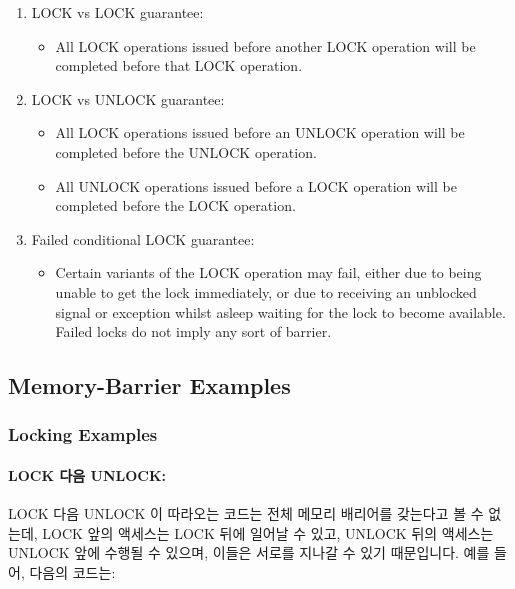 \begin{enumerate}
\begin{enumerate}
\item	LOCK vs LOCK guarantee:
	\begin{itemize}
	\item	All LOCK operations issued before another LOCK operation
		will be completed before that LOCK operation.
	\end{itemize}
\item	LOCK vs UNLOCK guarantee:
	\begin{itemize}
	\item	All LOCK operations issued before an UNLOCK operation
		will be completed before the UNLOCK operation.
	\item	All UNLOCK operations issued before a LOCK operation
		will be completed before the LOCK operation.
	\end{itemize}
\item	Failed conditional LOCK guarantee:
	\begin{itemize}
	\item	Certain variants of the LOCK operation may fail, either
		due to being unable to get the lock immediately, or due
		to receiving an unblocked signal or exception
		whilst asleep waiting
		for the lock to become available.  Failed locks do not
		imply any sort of barrier.
	\end{itemize}
\end{enumerate}
\fi

\subsection{Memory-Barrier Examples}
\label{sec:advsync:Memory-Barrier Examples}

\subsubsection{Locking Examples}

\paragraph{LOCK 다음 UNLOCK:}
LOCK 다음 UNLOCK 이 따라오는 코드는 전체 메모리 배리어를 갖는다고 볼 수 없는데,
LOCK 앞의 액세스는 LOCK 뒤에 일어날 수 있고, UNLOCK 뒤의 액세스는 UNLOCK 앞에
수행될 수 있으며, 이들은 서로를 지나갈 수 있기 때문입니다.
예를 들어, 다음의 코드는:

\end{enumerate}
